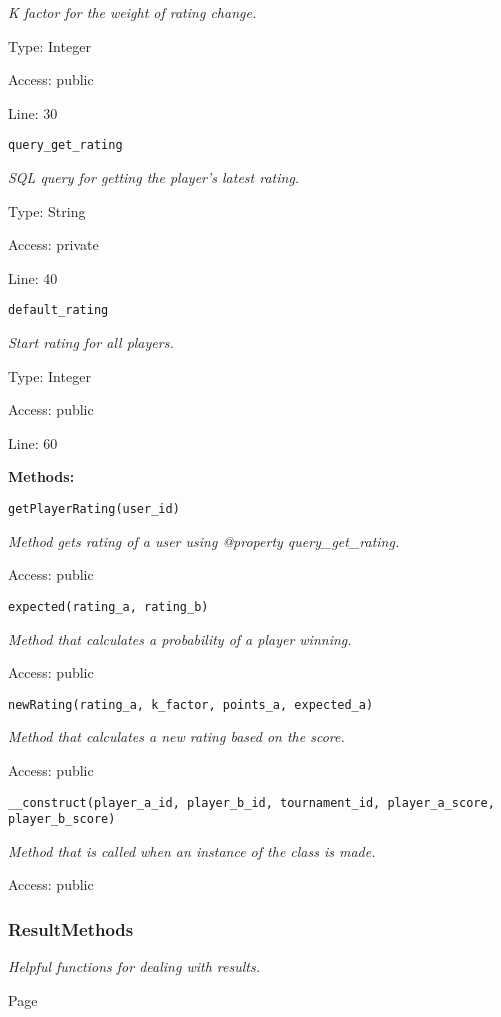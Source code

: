 {\scriptsize
\textit{K factor for the weight of rating change.}

Type: Integer

Access: public

Line: 30

}
\texttt{query\_get\_rating}

{\scriptsize
\textit{SQL query for getting the player's latest rating.}

Type: String

Access: private

Line: 40

}
\texttt{default\_rating}

{\scriptsize
\textit{Start rating for all players.}

Type: Integer

Access: public

Line: 60

}
\textbf{Methods:}

\texttt{getPlayerRating(user\_id)}

{\scriptsize
\textit{Method gets rating of a user using @property query\_get\_rating.}

Access: public

}

\texttt{expected(rating\_a, rating\_b)}

{\scriptsize
\textit{Method that calculates a probability of a player winning.}

Access: public

}

\texttt{newRating(rating\_a, k\_factor, points\_a, expected\_a)}

{\scriptsize
\textit{Method that calculates a new rating based on the score.}

Access: public

}

\texttt{\_\_construct(player\_a\_id, player\_b\_id, tournament\_id, player\_a\_score, player\_b\_score)}

{\scriptsize
\textit{Method that is called when an instance of the class is made.}

Access: public

}

\subsubsection{ResultMethods}
\textit{Helpful functions for dealing with results.}

Page \pageref{ResultMethods.php}

